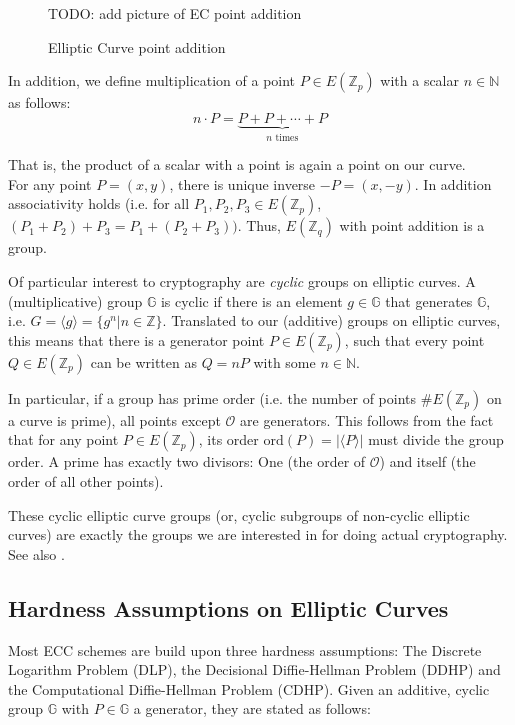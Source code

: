 \begin{figure}
    TODO: add picture of EC point addition
    \caption{Elliptic Curve point addition}
\end{figure}

In addition, we define multiplication of a point $P \in E(\mathbb{Z}_p)$ with a scalar $n \in \mathbb{N}$ as follows:
\begin{equation}
    n \cdot P = \underbrace{P + P + \cdots + P}_{n \text{ times}}
\end{equation}

That is, the product of a scalar with a point is again a point on our curve.
\\

For any point $P = (x,y)$, there is unique inverse $-P = (x, -y)$.
In addition associativity holds (i.e. for all $P_1, P_2, P_3 \in E(\mathbb{Z}_p)$, $(P_1 + P_2) + P_3 = P_1 + (P_2 + P_3))$.
Thus, $E(\mathbb{Z}_q)$ with point addition is a group. \cite{katz_introduction_2015}

Of particular interest to cryptography are \emph{cyclic} groups on elliptic curves. 
A (multiplicative) group $\mathbb{G}$ is cyclic if there is an element $g \in \mathbb{G}$ that generates $\mathbb{G}$, i.e. $G = \langle g \rangle = \{g^n | n \in \mathbb{Z}\}$.
Translated to our (additive) groups on elliptic curves, this means that there is a generator point $P \in E(\mathbb{Z}_p)$, such that every point $Q \in E(\mathbb{Z}_p)$ can be written as $Q = nP$ with some $n \in \mathbb{N}$.

In particular, if a group has prime order (i.e. the number of points $\#E(\mathbb{Z}_p)$ on a curve is prime), all points except $\mathcal{O}$ are generators.
This follows from the fact that for any point $P \in E(\mathbb{Z}_p)$, its order $\text{ord}(P) = | \langle P \rangle |$ must divide the group order.
A prime has exactly two divisors: One (the order of $\mathcal{O}$) and itself (the order of all other points).

These cyclic elliptic curve groups (or, cyclic subgroups of non-cyclic elliptic curves) are exactly the groups we are interested in for doing actual cryptography. See also \cite[p.~321]{katz_introduction_2015}.

\subsection{Hardness Assumptions on Elliptic Curves}

Most ECC schemes are build upon three hardness assumptions: The Discrete Logarithm Problem (DLP), the Decisional Diffie-Hellman Problem (DDHP) and the Computational Diffie-Hellman Problem (CDHP).
Given an additive, cyclic group $\mathbb{G}$ with $P \in \mathbb{G}$ a generator, they are stated as follows:
\\


